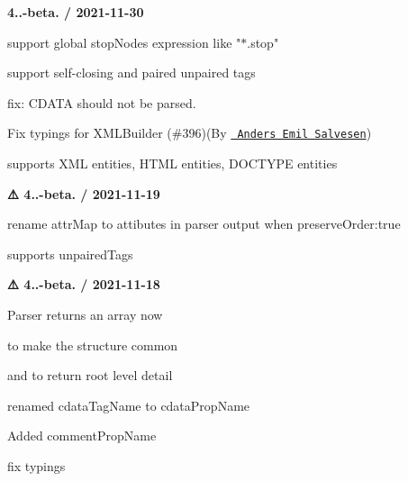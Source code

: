 {\bfseries{4..-\/beta. / 2021-\/11-\/30}}
\begin{DoxyItemize}
\item support global stop\+Nodes expression like "{}\texorpdfstring{$\ast$}{*}.\+stop"{}
\item support self-\/closing and paired unpaired tags
\item fix\+: CDATA should not be parsed.
\item Fix typings for XMLBuilder (\#396)(By \href{https://github.com/andersem}{\texttt{ Anders Emil Salvesen}})
\item supports XML entities, HTML entities, DOCTYPE entities
\end{DoxyItemize}

{\bfseries{⚠️ 4..-\/beta. / 2021-\/11-\/19}}
\begin{DoxyItemize}
\item rename {\ttfamily attr\+Map} to {\ttfamily attibutes} in parser output when {\ttfamily preserve\+Order\+:true}
\item supports unpaired\+Tags
\end{DoxyItemize}

{\bfseries{⚠️ 4..-\/beta. / 2021-\/11-\/18}}
\begin{DoxyItemize}
\item Parser returns an array now
\begin{DoxyItemize}
\item to make the structure common
\item and to return root level detail
\end{DoxyItemize}
\item renamed {\ttfamily cdata\+Tag\+Name} to {\ttfamily cdata\+Prop\+Name}
\item Added {\ttfamily comment\+Prop\+Name}
\item fix typings
\end{DoxyItemize}

